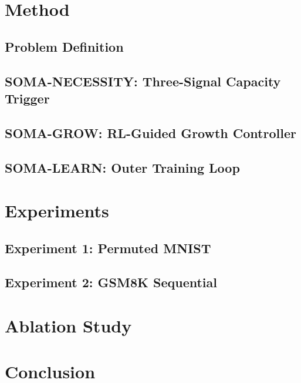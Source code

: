 \documentclass[11pt,a4paper]{article}
\begin{document}
\section{Method}
\label{sec:method}

\subsection{Problem Definition}

\subsection{SOMA-NECESSITY: Three-Signal Capacity Trigger}

\subsection{SOMA-GROW: RL-Guided Growth Controller}

\subsection{SOMA-LEARN: Outer Training Loop}

\section{Experiments}
\label{sec:experiments}

\subsection{Experiment 1: Permuted MNIST}

\subsection{Experiment 2: GSM8K Sequential}

\section{Ablation Study}
\label{sec:ablation}


\section{Conclusion}
\label{sec:conclusion}




\end{document}
